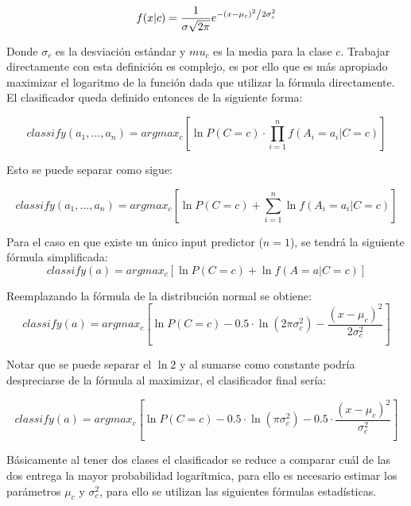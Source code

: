 \documentclass[letter, titlepage, 10pt]{article}
\begin{document}
\begin{equation}
f(x|c) = \frac{1}{{\sigma \sqrt {2\pi } }}e^{{{ - \left( {x - \mu_c } \right)^2 } \mathord{\left/ {\vphantom {{ - \left( {x - \mu_c } \right)^2 } {2\sigma_c ^2 }}} \right. \kern-\nulldelimiterspace} {2\sigma_c ^2 }}}
\end{equation}

Donde $\sigma_c$ es la desviación estándar y $mu_c$ es la media para la clase $c$. Trabajar directamente con esta definición es complejo, es por ello que es más apropiado maximizar el logaritmo de la función dada que utilizar la fórmula directamente. El clasificador queda definido entonces de la siguiente forma:

\begin{equation}
classify(a_1,...,a_n) = argmax_{c}\left[ \ln{P(C = c)\cdot \prod\limits_{i=1}^n f(A_i = a_i|C = c)}\right]
\end{equation}

Esto se puede separar como sigue:

\begin{equation}
classify(a_1,...,a_n) = argmax_{c}\left[ \ln{P(C = c)} + \sum\limits_{i=1}^n{\ln{f(A_i = a_i|C = c)}}\right]
\end{equation}

Para el caso en que existe un único input predictor ($n = 1$), se tendrá la siguiente fórmula simplificada:
\begin{equation}
classify(a) = argmax_{c}\left[ \ln{P(C = c)} + \ln{f(A = a|C = c)}\right]
\end{equation}

Reemplazando la fórmula de la distribución normal se obtiene:
\begin{equation}
classify(a) = argmax_{c}\left[ \ln{P(C = c)} -0.5\cdot \ln{(2 \pi \sigma_c^2)} - \frac{(x - \mu_c)^2}{2 \sigma_c ^2}  \right]
\end{equation}

Notar que se puede separar el $\ln{2}$ y al sumarse como constante podría despreciarse de la fórmula al maximizar, el clasificador final sería:

\begin{equation}
classify(a) = argmax_{c}\left[ \ln{P(C = c)} -0.5\cdot \ln{(\pi \sigma_c^2)} - 0.5 \cdot \frac{(x - \mu_c)^2}{\sigma_c^2}  \right]
\end{equation}

Básicamente al tener dos clases el clasificador se reduce a comparar cuál de las dos entrega la mayor probabilidad logarítmica, para ello es necesario estimar los parámetros $\mu_c$ y $\sigma_c^2$, para ello se utilizan las siguientes fórmulas estadísticas.
\end{document}
